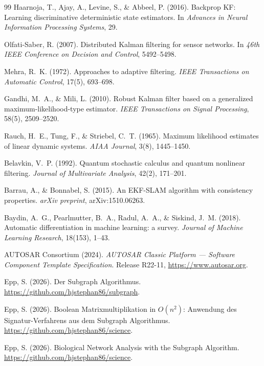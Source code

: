﻿\documentclass[a4paper,12pt]{article}
\theoremstyle{definition}
\begin{document}
\begin{thebibliography}{99}
Haarnoja, T., Ajay, A., Levine, S., \& Abbeel, P. (2016).
Backprop KF: Learning discriminative deterministic state estimators.
In \emph{Advances in Neural Information Processing Systems}, 29.

Olfati-Saber, R. (2007).
Distributed Kalman filtering for sensor networks.
In \emph{46th IEEE Conference on Decision and Control}, 5492--5498.

Mehra, R.~K. (1972).
Approaches to adaptive filtering.
\emph{IEEE Transactions on Automatic Control}, 17(5), 693--698.

Gandhi, M.~A., \& Mili, L. (2010).
Robust Kalman filter based on a generalized maximum-likelihood-type estimator.
\emph{IEEE Transactions on Signal Processing}, 58(5), 2509--2520.

Rauch, H.~E., Tung, F., \& Striebel, C.~T. (1965).
Maximum likelihood estimates of linear dynamic systems.
\emph{AIAA Journal}, 3(8), 1445--1450.

Belavkin, V.~P. (1992).
Quantum stochastic calculus and quantum nonlinear filtering.
\emph{Journal of Multivariate Analysis}, 42(2), 171--201.

Barrau, A., \& Bonnabel, S. (2015).
An EKF-SLAM algorithm with consistency properties.
\emph{arXiv preprint}, arXiv:1510.06263.

Baydin, A.~G., Pearlmutter, B.~A., Radul, A.~A., \& Siskind, J.~M. (2018).
Automatic differentiation in machine learning: a survey.
\emph{Journal of Machine Learning Research}, 18(153), 1--43.

AUTOSAR Consortium (2024).
\emph{AUTOSAR Classic Platform --- Software Component Template Specification}.
Release R22-11, \url{https://www.autosar.org}.

Epp, S. (2026).
Der Subgraph Algorithmus.
\url{https://github.com/hjstephan86/subgraph}.

Epp, S. (2026).
Boolean Matrixmultiplikation in $O(n^2)$: Anwendung des Signatur-Verfahrens
aus dem Subgraph Algorithmus.
\url{https://github.com/hjstephan86/science}.

Epp, S. (2026).
Biological Network Analysis with the Subgraph Algorithm.
\url{https://github.com/hjstephan86/science}.

\end{thebibliography}
\end{document}
